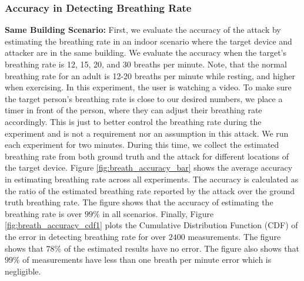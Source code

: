 \subsubsection{Accuracy in Detecting Breathing Rate}
\noindent\textbf{Same Building Scenario:} First, we evaluate the accuracy of the attack by estimating the breathing rate in an indoor scenario where the target device and attacker are in the same building. We evaluate the accuracy when the target's breathing rate is 12, 15, 20, and 30 breaths per minute.  Note, that the normal breathing rate for an adult is 12-20 breaths per minute while resting, and higher when exercising. In this experiment, the user is watching a video. To make sure the target person's breathing rate is close to our desired numbers, we place a timer in front of the person, where they can adjust their breathing rate accordingly. 
This is just to better control the breathing rate during the experiment and is not a requirement nor an assumption in this attack.
We run each experiment for two minutes. During this time, we collect the estimated breathing rate from both ground truth and the attack for different locations of the target device. Figure \ref{fig:breath_accuracy_bar} shows the average accuracy in estimating breathing rate across all experiments. The accuracy is calculated as the ratio of the estimated breathing rate reported by the attack over the ground truth breathing rate. The figure shows that the accuracy of estimating the breathing rate is over $99$\% in all scenarios.  Finally, Figure \ref{fig:breath_accuracy_cdf1} plots the Cumulative Distribution Function (CDF) of the error in  detecting breathing rate for over $2400$ measurements. The figure shows that $78\%$ of the estimated results have no error. The figure also shows that $99\%$ of measurements have less than one breath per minute error which is negligible. 


